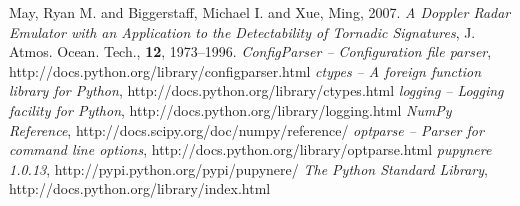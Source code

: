 \documentclass[twocolumn]{article}
\begin{document}
\begin{thebibliography}{9}
                May, Ryan M. and Biggerstaff, Michael I. and Xue, Ming, 2007.
                \emph{A Doppler Radar Emulator with an Application to the Detectability of Tornadic Signatures},
                J. Atmos. Ocean. Tech., \textbf{12}, 1973--1996.
                \emph{ConfigParser -- Configuration file parser},
                http://docs.python.org/library/configparser.html
                \emph{ctypes -- A foreign function library for Python},
                http://docs.python.org/library/ctypes.html
                \emph{logging -- Logging facility for Python},
                http://docs.python.org/library/logging.html
                \emph{NumPy Reference},
                http://docs.scipy.org/doc/numpy/reference/
                \emph{optparse -- Parser for command line options},
                http://docs.python.org/library/optparse.html
                \emph{pupynere 1.0.13},
                http://pypi.python.org/pypi/pupynere/
                \emph{The Python Standard Library},
                http://docs.python.org/library/index.html
\end{thebibliography}
\end{document}
